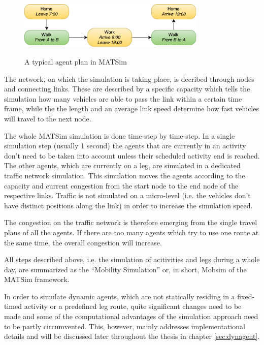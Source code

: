 \begin{figure}
\centering
\includegraphics[width=0.8\textwidth]{../simpleplan.pdf}
\label{fig:typical_plan}
\caption{A typical agent plan in MATSim}
\end{figure}

The network, on which the simulation is taking place, is decribed through nodes
 and connecting links. These are described by a specific capacity which tells the
 simulation how many vehicles are able to pass the link within a certain time
 frame, while the the length and an average link speed determine how fast vehicles
 will travel to the next node.

 The whole MATSim simulation is done time-step by time-step. In a single simulation step (usually 1 second)
 the agents that are currently in an activity don't need to be taken into account unless their scheduled
 activity end is reached. The other agents, which are currently on a leg, are simulated in a
 dedicated traffic network simulation. This simulation moves the agents according
 to the capacity and current congestion from the start node to the end node of the
 respective links. Traffic is not simulated on a micro-level (i.e. the vehicles
 don't have distinct positions along the link) in order to increase the simulation
 speed.

The congestion on the traffic network is therefore emerging from the single travel
plans of all the agents. If there are too many agents which try to use one route
at the same time, the overall congestion will increase.

All steps described above, i.e. the simulation of acitivities and legs during
a whole day, are summarized as the ``Mobility Simulation'' or, in short, Mobsim
of the MATSim framework.

In order to simulate dynamic agents, which are not statically residing in a
fixed-timed activity or a predefined leg route, quite significant changes need
to be made and some of the computational advantages of the simulation approach
need to be partly circumvented. This, however, mainly addresses implementational
details and will be discussed later throughout the thesis in chapter \ref{sec:dynagent}.

